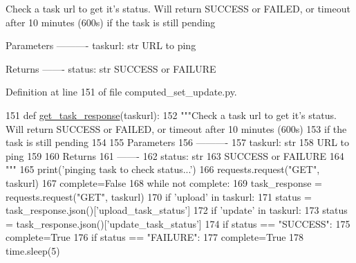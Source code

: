 \begin{DoxyVerb}Check a task url to get it's status. Will return SUCCESS or FAILED, or timeout after 10 minutes (600s)
   if the task is still pending

Parameters
----------
taskurl: str
    URL to ping
    
Returns
-------
status: str
    SUCCESS or FAILURE
\end{DoxyVerb}
 

Definition at line 151 of file computed\+\_\+set\+\_\+update.\+py.


\begin{DoxyCode}
151 \textcolor{keyword}{def }\hyperlink{namespacefragalysis__api_1_1xcextracter_1_1computed__set__update_a5065036bae4e3eea5df321d366767d29}{get\_task\_response}(taskurl):
152     \textcolor{stringliteral}{"""Check a task url to get it's status. Will return SUCCESS or FAILED, or timeout after 10 minutes
       (600s)}
153 \textcolor{stringliteral}{       if the task is still pending}
154 \textcolor{stringliteral}{    }
155 \textcolor{stringliteral}{    Parameters}
156 \textcolor{stringliteral}{    ----------}
157 \textcolor{stringliteral}{    taskurl: str}
158 \textcolor{stringliteral}{        URL to ping}
159 \textcolor{stringliteral}{        }
160 \textcolor{stringliteral}{    Returns}
161 \textcolor{stringliteral}{    -------}
162 \textcolor{stringliteral}{    status: str}
163 \textcolor{stringliteral}{        SUCCESS or FAILURE}
164 \textcolor{stringliteral}{    """}
165     print(\textcolor{stringliteral}{'pinging task to check status...'})
166     requests.request(\textcolor{stringliteral}{"GET"}, taskurl)
167     complete=\textcolor{keyword}{False}
168     \textcolor{keywordflow}{while} \textcolor{keywordflow}{not} complete:
169         task\_response = requests.request(\textcolor{stringliteral}{"GET"}, taskurl)
170         \textcolor{keywordflow}{if} \textcolor{stringliteral}{'upload'} \textcolor{keywordflow}{in} taskurl:
171             status = task\_response.json()[\textcolor{stringliteral}{'upload\_task\_status'}]
172         \textcolor{keywordflow}{if} \textcolor{stringliteral}{'update'} \textcolor{keywordflow}{in} taskurl:
173             status = task\_response.json()[\textcolor{stringliteral}{'update\_task\_status'}]
174         \textcolor{keywordflow}{if} status == \textcolor{stringliteral}{"SUCCESS"}:
175             complete=\textcolor{keyword}{True}
176         \textcolor{keywordflow}{if} status == \textcolor{stringliteral}{"FAILURE"}:
177             complete=\textcolor{keyword}{True}
178         time.sleep(5)

\end{DoxyCode}
